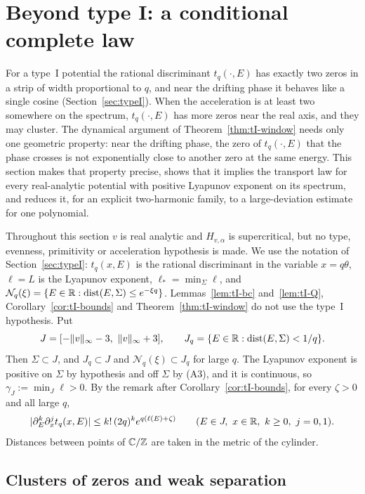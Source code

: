 \section{Beyond type I: a conditional complete law}\label{sec:beyond}

For a type~I potential the rational discriminant $t_q(\cdot,E)$ has exactly two zeros in a strip of width proportional to $q$, and near the drifting phase it behaves like a single cosine (Section~\ref{sec:typeI}). When the acceleration is at least two somewhere on the spectrum, $t_q(\cdot,E)$ has more zeros near the real axis, and they may cluster. The dynamical argument of Theorem~\ref{thm:tI-window} needs only one geometric property: near the drifting phase, the zero of $t_q(\cdot,E)$ that the phase crosses is not exponentially close to another zero at the same energy. This section makes that property precise, shows that it implies the transport law for every real-analytic potential with positive Lyapunov exponent on its spectrum, and reduces it, for an explicit two-harmonic family, to a large-deviation estimate for one polynomial.

Throughout this section $v$ is real analytic and $H_{v,\alpha}$ is supercritical, but no type, evenness, primitivity or acceleration hypothesis is made. We use the notation of Section~\ref{sec:typeI}: $t_q(x,E)$ is the rational discriminant in the variable $x=q\theta$, $\ell=L$ is the Lyapunov exponent, $\ell_*=\min_\Sigma\ell$, and $\mathcal N_q(\xi)=\{E\in\mathbb R:\operatorname{dist}(E,\Sigma)\le e^{-\xi q}\}$. Lemmas~\ref{lem:tI-bc} and~\ref{lem:tI-Q}, Corollary~\ref{cor:tI-bounds} and Theorem~\ref{thm:tI-window} do not use the type~I hypothesis. Put
\[
J=[-\|v\|_\infty-3,\ \|v\|_\infty+3],\qquad J_q=\{E\in\R:\dist(E,\Sigma)<1/q\}.
\]
Then $\Sigma\subset J$, and $J_q\subset J$ and $\mathcal N_q(\xi)\subset J_q$ for large $q$. The Lyapunov exponent is positive on $\Sigma$ by hypothesis and off $\Sigma$ by (A3), and it is continuous, so $\gamma_J:=\min_J\ell>0$. By the remark after Corollary~\ref{cor:tI-bounds}, for every $\zeta>0$ and all large $q$,
\begin{equation}\label{eq:UB}
|\partial_E^k\partial_x^jt_q(x,E)|\le k!\,(2q)^ke^{q(\ell(E)+\zeta)}\qquad(E\in J,\ x\in\R,\ k\ge0,\ j=0,1).
\end{equation}
Distances between points of $\mathbb C/\mathbb Z$ are taken in the metric of the cylinder.

\subsection{Clusters of zeros and weak separation}\label{sec:WXS}

